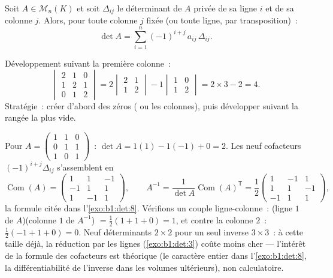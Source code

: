 \begin{theorem}\label{thm:b1:det:cofactor}
Soit $A \in \mathcal{M}_n(K)$ et soit $\Delta_{ij}$ le déterminant de
$A$ privée de sa ligne $i$ et de sa colonne $j$. Alors, pour toute
colonne $j$ fixée (ou toute ligne, par transposition)~:
\[
\det A = \sum_{i=1}^{n} (-1)^{i+j}\, a_{ij}\, \Delta_{ij} .
\]
\end{theorem}
\admitted

\begin{example}\label{ex:b1:det:cofactor}
Développement suivant la première colonne~:
\[
\begin{vmatrix}
2 & 1 & 0\\
1 & 2 & 1\\
0 & 1 & 2
\end{vmatrix}
= 2\begin{vmatrix} 2 & 1\\ 1 & 2\end{vmatrix}
- 1\begin{vmatrix} 1 & 0\\ 1 & 2\end{vmatrix}
= 2 \times 3 - 2 = 4 .
\]
Stratégie~: créer d'abord des zéros ( ou les
colonnes), puis développer suivant la rangée la plus vide.
\end{example}

\begin{example}
\label{ex:b1:det:cofactorinverse}
Pour $A = \begin{pmatrix} 1 & 1 & 0\\ 0 & 1 & 1\\ 1 & 0 &
1\end{pmatrix}$~: $\det A = 1(1) - 1(-1) + 0 = 2$. Les neuf
cofacteurs $(-1)^{i+j}\Delta_{ij}$ s'assemblent en
\[
\operatorname{Com}(A) = \begin{pmatrix}
1 & 1 & -1\\
-1 & 1 & 1\\
1 & -1 & 1
\end{pmatrix},
\qquad
A^{-1} = \frac{1}{\det A}\operatorname{Com}(A)^{\mathsf T}
= \frac12\begin{pmatrix}
1 & -1 & 1\\
1 & 1 & -1\\
-1 & 1 & 1
\end{pmatrix},
\]
la formule citée dans l'\cref{exo:b1:det:8}. Vérifions un couple
ligne-colonne~: (ligne $1$ de $A$)(colonne $1$ de $A^{-1}$)
$= \frac12(1 + 1 + 0) = 1$, et contre la colonne $2$~:
$\frac12(-1 + 1 + 0) = 0$. Neuf déterminants $2\times2$ pour un seul
inverse $3\times3$~: à cette taille déjà, la réduction par les lignes
(\cref{exo:b1:det:3}) coûte moins cher --- l'intérêt de la formule des
cofacteurs est théorique (le caractère entier dans
l'\cref{exo:b1:det:8}, la différentiabilité de l'inverse dans les
volumes ultérieurs), non calculatoire.
\end{example}


